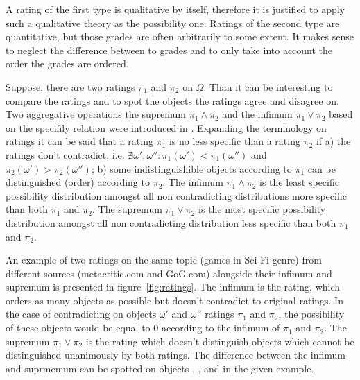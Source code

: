 \documentclass[twoside]{article}
\begin{document}
A rating of the first type is qualitative by itself, therefore it is justified to apply such a qualitative theory as the possibility one. Ratings of the second type are quantitative, but those grades are often arbitrarily to some extent. It makes sense to neglect the difference between to grades and to only take into account the order the grades are ordered.

Suppose, there are two ratings $\pi_1$ and $\pi_2$ on $\Omega$. Than it can be interesting to compare the ratings and to spot the objects the ratings agree and disagree on. Two aggregative operations the supremum $\pi_1\land\pi_2$ and the infimum $\pi_1\lor\pi_2$ based on the specifily relation were introduced in \cite{Zubyuk21}. Expanding the terminology on ratings it can be said that a rating $\pi_1$ is no less specific than a rating $\pi_2$ if a) the ratings don't contradict, i.e. $\nexists \omega', \omega'': \pi_1(\omega') < \pi_1(\omega'')$ and $\pi_2(\omega') > \pi_2(\omega'')$; b) some indistinguishible objects according to $\pi_1$ can be distinguished (order) according to $\pi_2$. The infimum $\pi_1\land\pi_2$ is the least specific possibility distribution amongst all non contradicting distributions more specific than both $\pi_1$ and $\pi_2$. The supremum $\pi_1\lor\pi_2$ is the most specific possibility distribution amongst all non contradicting distribution less specific than both $\pi_1$ and $\pi_2$.

An example of two ratings on the same topic (games in Sci-Fi genre) from different sources (metacritic.com and GoG.com) alongside their infimum and supremum is presented in figure~\ref{fig:ratings}. The infimum is the rating, which orders as many objects as possible but doesn't contradict to original ratings. In the case of contradicting on objects $\omega'$ and $\omega''$ ratings $\pi_1$ and $\pi_2$, the possibility of these objects would be equal to 0 according to the infimum of $\pi_1$ and $\pi_2$. The supremum $\pi_1\lor\pi_2$ is the rating which doesn't distinguish objects which cannot be distinguished unanimously by both ratings. The difference between the infimum and suprmemum can be spotted on objects , ,  and  in the given example. 
\end{document}
